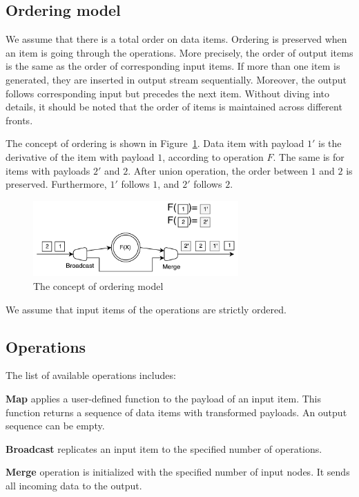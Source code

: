 \subsection{Ordering model}

We assume that there is a total order on data items. Ordering is preserved when an item is going through the operations. More precisely, the order of output items is the same as the order of corresponding input items. If more than one item is generated, they are inserted in output stream sequentially. Moreover, the output follows corresponding input but precedes the next item. Without diving into details, it should be noted that the order of items is maintained across different fronts.

The concept of ordering is shown in Figure~\ref{ordering}. Data item with payload $1'$ is the derivative of the item with payload $1$, according to operation $F$. The same is for items with payloads $2'$ and $2$. After union operation, the order between $1$ and $2$ is preserved. Furthermore, $1'$ follows $1$, and $2'$ follows $2$.  

\begin{figure}[htbp]
  \centering
  \includegraphics[width=0.7\textwidth]{pics/ordering}
  \caption{The concept of ordering model}
  \label {ordering}
\end{figure}

We assume that input items of the operations are strictly ordered.

\subsection{Operations}

The list of available operations includes:

{\bf Map} applies a user-defined function to the payload of an input item. This function returns a sequence of data items with transformed payloads. An output sequence can be empty.

{\bf Broadcast} replicates an input item to the specified number of operations.

{\bf Merge} operation is initialized with the specified number of input nodes. It sends all incoming data to the output.

